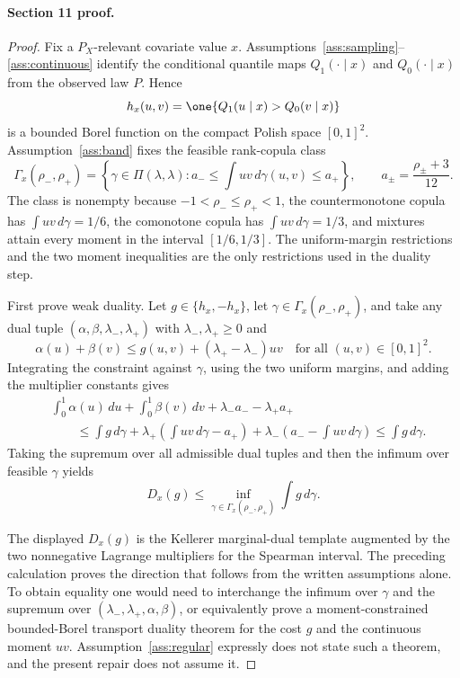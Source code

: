 \paragraph{Section 11 proof.}
\begin{proof}
Fix a \(P_X\)-relevant covariate value \(x\).  Assumptions~\ref{ass:sampling}--\ref{ass:continuous} identify the conditional quantile maps \(Q_1(\cdot\mid x)\) and \(Q_0(\cdot\mid x)\) from the observed law \(P\).  Hence
\[
h_x(u,v)=\one\{Q_1(u\mid x)>Q_0(v\mid x)\}
\]
is a bounded Borel function on the compact Polish space \([0,1]^2\).  Assumption~\ref{ass:band} fixes the feasible rank-copula class
\[
\Gamma_x(\rho_-,\rho_+)=
\left\{\gamma\in\Pi(\lambda,\lambda):
a_-\le \int uv\,d\gamma(u,v)\le a_+\right\},
\qquad
a_\pm=\frac{\rho_\pm+3}{12}.
\]
The class is nonempty because \(-1<\rho_-\le\rho_+<1\), the countermonotone copula has \(\int uv\,d\gamma=1/6\), the comonotone copula has \(\int uv\,d\gamma=1/3\), and mixtures attain every moment in the interval \([1/6,1/3]\).  The uniform-margin restrictions and the two moment inequalities are the only restrictions used in the duality step.

First prove weak duality.  Let \(g\in\{h_x,-h_x\}\), let \(\gamma\in\Gamma_x(\rho_-,\rho_+)\), and take any dual tuple \((\alpha,\beta,\lambda_-,\lambda_+)\) with \(\lambda_-,\lambda_+\ge0\) and
\[
\alpha(u)+\beta(v)\le g(u,v)+(\lambda_+-\lambda_-)uv
\quad\text{for all }(u,v)\in[0,1]^2.
\]
Integrating the constraint against \(\gamma\), using the two uniform margins, and adding the multiplier constants gives
\[
\begin{aligned}
&\int_0^1\alpha(u)\,du+\int_0^1\beta(v)\,dv+\lambda_-a_- -\lambda_+a_+\\
&\qquad\le
\int g\,d\gamma
+\lambda_+\left(\int uv\,d\gamma-a_+\right)
+\lambda_-\left(a_--\int uv\,d\gamma\right)
\le \int g\,d\gamma.
\end{aligned}
\]
Taking the supremum over all admissible dual tuples and then the infimum over feasible \(\gamma\) yields
\[
D_x(g)\le \inf_{\gamma\in\Gamma_x(\rho_-,\rho_+)}\int g\,d\gamma.
\]

The displayed \(D_x(g)\) is the Kellerer marginal-dual template \cite{Kellerer1984Duality} augmented by the two nonnegative Lagrange multipliers for the Spearman interval.  The preceding calculation proves the direction that follows from the written assumptions alone.  To obtain equality one would need to interchange the infimum over \(\gamma\) and the supremum over \((\lambda_-,\lambda_+,\alpha,\beta)\), or equivalently prove a moment-constrained bounded-Borel transport duality theorem for the cost \(g\) and the continuous moment \(uv\).  Assumption~\ref{ass:regular} expressly does not state such a theorem, and the present repair does not assume it.


\end{proof}
